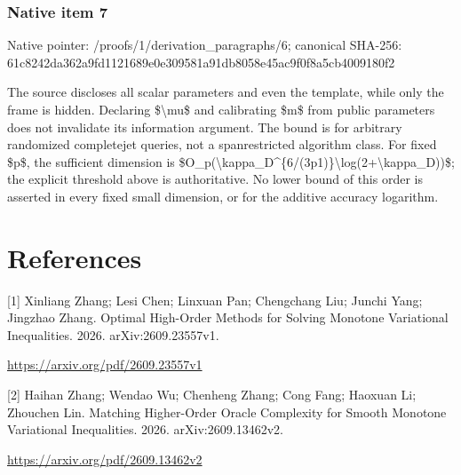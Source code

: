 \documentclass[10pt,a4paper]{article}
\begin{document}
\subsubsection{Native item 7}


Native pointer: /proofs/1/derivation\_paragraphs/6; canonical SHA-256: 61c8242da362a9fd1121689e\allowbreak{}0e309581a91db8058e45ac9f\allowbreak{}0f8a5cb4009180f2


The source discloses all scalar parameters and even the template, while only the frame is hidden. Declaring \$\textbackslash{}mu\$ and calibrating \$m\$ from public parameters does not invalidate its information argument. The bound is for arbitrary randomized completejet queries, not a spanrestricted algorithm class. For fixed \$p\$, the sufficient dimension is \$O\_p(\textbackslash{}kappa\_D\textasciicircum{}\{6/(3p1)\}\allowbreak{}\textbackslash{}log(2+\textbackslash{}kappa\_D))\$; the explicit threshold above is authoritative. No lower bound of this order is asserted in every fixed small dimension, or for the additive accuracy logarithm.


\section{References}


[1] Xinliang Zhang; Lesi Chen; Linxuan Pan; Chengchang Liu; Junchi Yang; Jingzhao Zhang. Optimal High-Order Methods for Solving Monotone Variational Inequalities. 2026. arXiv:2609.23557v1.



\url{https://arxiv.org/pdf/2609.23557v1}



[2] Haihan Zhang; Wendao Wu; Chenheng Zhang; Cong Fang; Haoxuan Li; Zhouchen Lin. Matching Higher-Order Oracle Complexity for Smooth Monotone Variational Inequalities. 2026. arXiv:2609.13462v2.



\url{https://arxiv.org/pdf/2609.13462v2}
\end{document}
